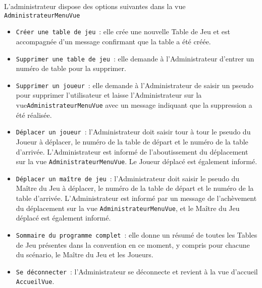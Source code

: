 \documentclass[11pt]{article}
\begin{document}
L'administrateur dispose des options suivantes dans la vue \texttt{AdministrateurMenuVue}
\begin{itemize}[label=, font=\small]
    \item \texttt{Créer une table de jeu}~: elle crée une nouvelle Table de Jeu et est accompagnée d'un message confirmant que la table a été créée.
    \item \texttt{Supprimer une table de jeu}~: elle demande à l'Administrateur d'entrer un numéro de table pour la supprimer. 
    \item \texttt{Supprimer un joueur}~: elle demande à l'Administrateur de saisir un pseudo pour supprimer l'utilisateur et laisse l'Administrateur sur la vue\texttt{AdministrateurMenuVue} avec un message indiquant que la suppression a été réalisée.
    \item \texttt{Déplacer un joueur}~: l'Administrateur doit saisir tour à tour le pseudo du Joueur à déplacer, le numéro de la table de départ et le numéro de la table d'arrivée. L'Administrateur est informé de l'aboutissement du déplacement sur la vue \texttt{AdministrateurMenuVue}. Le Joueur déplacé est également informé.
    \item \texttt{Déplacer un maître de jeu}~: l'Administrateur doit saisir le pseudo du Maître du Jeu à déplacer, le numéro de la table de départ et le numéro de la table d'arrivée. L'Administrateur est informé par un message de l'achèvement du déplacement sur la vue \texttt{AdministrateurMenuVue}, et le Maître du Jeu déplacé est également informé.
    \item \texttt{Sommaire du programme complet}~: elle donne un résumé de toutes les Tables de Jeu présentes dans la convention en ce moment, y compris pour chacune du scénario, le Maître du Jeu et les Joueurs.
    \item \texttt{Se déconnecter}~: l'Administrateur se déconnecte et revient à la vue d'accueil \texttt{AccueilVue}.
\end{itemize}
\bigbreak
\end{document}
